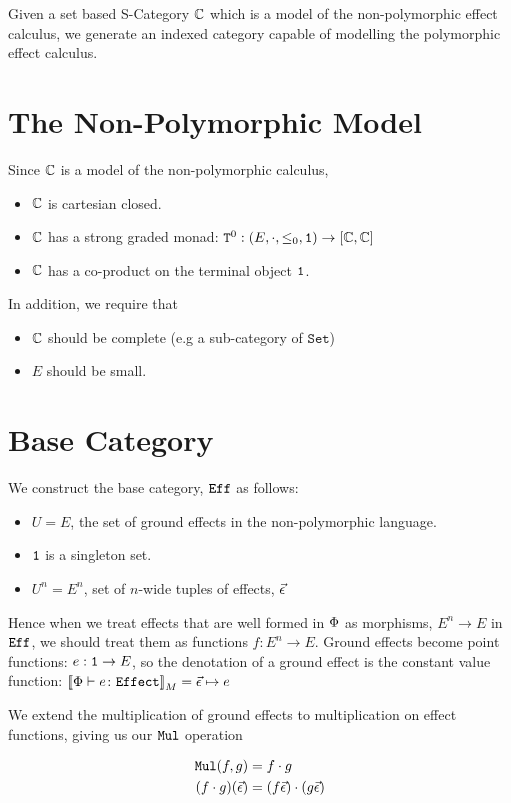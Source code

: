 \documentclass{report}
\newcommand{\Tz}[2]{\texttt{T}^0_{#1}#2}
\newcommand\set[0]{\texttt{Set}}
\newcommand\ev[0]{\vec{\e}}
\begin{document}
Given a set based S-Category $\C$ which is a model of the non-polymorphic effect calculus, we generate an indexed category capable of modelling the polymorphic effect calculus.
\section{The Non-Polymorphic Model}
Since $\C$ is a model of the non-polymorphic calculus,
\begin{itemize}
    \item $\C$ is cartesian closed.
    \item $\C$ has a strong graded monad: $\Tz{}{}: (E, \dot, \subeffect_0, \1) \rightarrow [\C, \C]$
    \item $\C$ has a co-product on the terminal object $\1$.
\end{itemize}

In addition, we require that 
\begin{itemize}
    \item $\C$ should be complete (e.g a sub-category of $\set$)
    \item $E$ should be small.
\end{itemize}


\section{Base Category}

We construct the base category, $\Eff$ as follows:

\begin{itemize}
    \item $U = E$, the set of ground effects in the non-polymorphic language.
    \item $\1$ is a singleton set.
    \item $U^n = E^n$, set of $n$-wide tuples of effects, $\vec{\e}$
\end{itemize}

Hence when we treat effects that are well formed in $\P$ as morphisms, $E^n \rightarrow E$ in $\Eff$, we should treat them as functions $f: E^n \rightarrow E$. Ground effects become point functions: $e: \1 \rightarrow E$, so the denotation of a ground effect is the constant value function: $\deno{\typerelation{\P}{e}{\effect}} = \ev \mapsto e$

We extend the multiplication of ground effects to multiplication on effect functions, giving us our $\Mul$ operation

\begin{align}
    \Mul(f, g) & = f\dot g\\
    (f\dot g)(\ev) & = (f\ev)\dot(g\ev)\\
\end{align}
\end{document}
